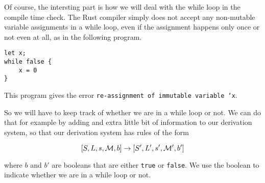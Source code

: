 Of course, the intersting part is how we will deal with the while loop in the compile time check. The Rust compiler simply does not accept any non-mutable variable assignments in a while loop, even if the assignment happens only once or not even at all, as in the following program.

\begin{verbatim}
let x;
while false {
    x = 0
}
\end{verbatim}

This program gives the error \texttt{re-assignment of immutable variable `x}.

So we will have to keep track of whether we are in a while loop or not. We can do that for example by adding and extra little bit of information to our derivation system, so that our derivation system has rules of the form 

$$[ S, L, s, \mathcal{M}, b ] \to [ S', L', s', \mathcal{M'}, b' ]$$

where $b$ and $b'$ are booleans that are either \texttt{true} or \texttt{false}. We use the boolean to indicate whether we are in a while loop or not. 

